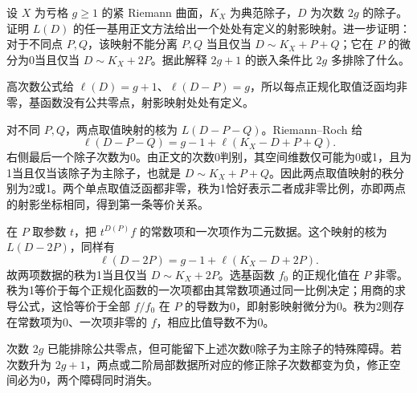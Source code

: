 \begin{exercise}\label{b3:ex:A-6}
设 \(X\) 为亏格 \(g\ge1\) 的紧 Riemann 曲面，\(K_X\) 为典范除子，\(D\) 为次数 \(2g\) 的除子。证明 \(L(D)\) 的任一基用正文方法给出一个处处有定义的射影映射。进一步证明：对于不同点 \(P,Q\)，该映射不能分离 \(P,Q\) 当且仅当 \(D\sim K_X+P+Q\)；它在 \(P\) 的微分为0当且仅当 \(D\sim K_X+2P\)。据此解释 \(2g+1\) 的嵌入条件比 \(2g\) 多排除了什么。
\end{exercise}
\begin{solution}
高次数公式给 \(\ell(D)=g+1\)、\(\ell(D-P)=g\)，所以每点正规化取值泛函均非零，基函数没有公共零点，射影映射处处有定义。

对不同 \(P,Q\)，两点取值映射的核为 \(L(D-P-Q)\)。Riemann--Roch 给
\[
 \ell(D-P-Q)=g-1+\ell(K_X-D+P+Q).
\]
右侧最后一个除子次数为0。由正文的次数0判别，其空间维数仅可能为0或1，且为1当且仅当该除子为主除子，也就是 \(D\sim K_X+P+Q\)。因此两点取值映射的秩分别为2或1。两个单点取值泛函都非零，秩为1恰好表示二者成非零比例，亦即两点的射影坐标相同，得到第一条等价关系。

在 \(P\) 取参数 \(t\)，把 \(t^{D(P)}f\) 的常数项和一次项作为二元数据。这个映射的核为 \(L(D-2P)\)，同样有
\[
 \ell(D-2P)=g-1+\ell(K_X-D+2P).
\]
故两项数据的秩为1当且仅当 \(D\sim K_X+2P\)。选基函数 \(f_0\) 的正规化值在 \(P\) 非零。秩为1等价于每个正规化函数的一次项都由其常数项通过同一比例决定；用商的求导公式，这恰等价于全部 \(f/f_0\) 在 \(P\) 的导数为0，即射影映射微分为0。秩为2则存在常数项为0、一次项非零的 \(f\)，相应比值导数不为0。

次数 \(2g\) 已能排除公共零点，但可能留下上述次数0除子为主除子的特殊障碍。若次数升为 \(2g+1\)，两点或二阶局部数据所对应的修正除子次数都变为负，修正空间必为0，两个障碍同时消失。
\end{solution}

